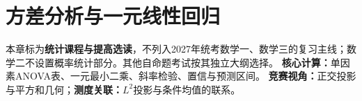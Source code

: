 \chapter{方差分析与一元线性回归}\label{ch:09}
\begin{examtip}
本章标为\textbf{统计课程与提高选读}，不列入2027年统考数学一、数学三的复习主线；数学二不设置概率统计部分。其他自命题考试按其独立大纲选择。
\textbf{核心计算：}单因素ANOVA表、一元最小二乘、斜率检验、置信与预测区间。
\textbf{竞赛视角：}正交投影与平方和几何；\textbf{测度关联：}$L^2$投影与条件均值的联系。
\end{examtip}
